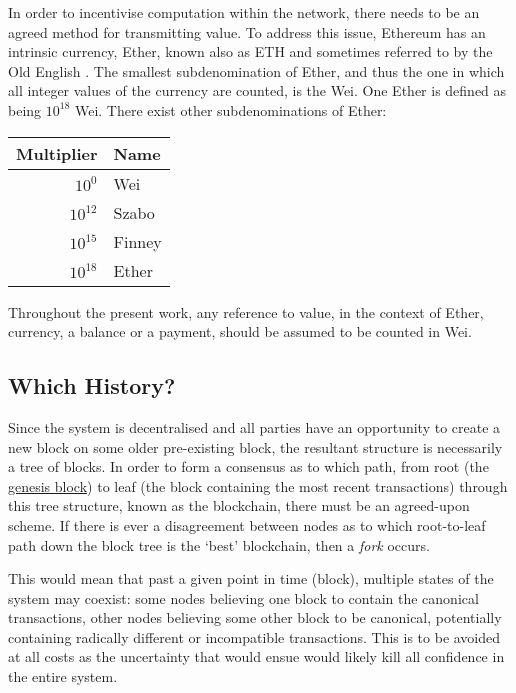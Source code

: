 \documentclass[9pt,oneside]{amsart}
\begin{document}
\begin{multicols}{2}
In order to incentivise computation within the network, there needs to be an agreed method for transmitting value. To address this issue, Ethereum has an intrinsic currency, Ether, known also as {\small ETH} and sometimes referred to by the Old English \DH{}. The smallest subdenomination of Ether, and thus the one in which all integer values of the currency are counted, is the Wei. One Ether is defined as being $10^{18}$ Wei. There exist other subdenominations of Ether:
\par
\begin{center}
\begin{tabular}{rl}
\toprule
Multiplier & Name \\
\midrule
$10^0$ & Wei \\
$10^{12}$ & Szabo \\
$10^{15}$ & Finney \\
$10^{18}$ & Ether \\
\bottomrule
\end{tabular}
\end{center}
\par

Throughout the present work, any reference to value, in the context of Ether, currency, a balance or a payment, should be assumed to be counted in Wei.

\subsection{Which History?}

Since the system is decentralised and all parties have an opportunity to create a new block on some older pre-existing block, the resultant structure is necessarily a tree of blocks. In order to form a consensus as to which path, from root (the \hyperlink{GenesisBlock}{genesis block}) to leaf (the block containing the most recent transactions) through this tree structure, known as the blockchain, there must be an agreed-upon scheme. If there is ever a disagreement between nodes as to which root-to-leaf path down the block tree is the `best' blockchain, then a \textit{fork} occurs.

This would mean that past a given point in time (block), multiple states of the system may coexist: some nodes believing one block to contain the canonical transactions, other nodes believing some other block to be canonical, potentially containing radically different or incompatible transactions. This is to be avoided at all costs as the uncertainty that would ensue would likely kill all confidence in the entire system.


\end{multicols}
\end{document}
